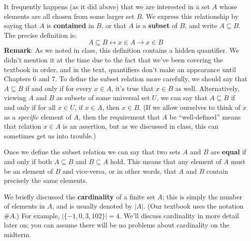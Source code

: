 \documentclass[letterpaper,12pt]{article}
\begin{document}
It frequently happens (as it did above) that we are interested in a set $A$ whose elements are all chosen from some larger set $B$. We express this relationship by saying that $A$ is {\bf contained} in $B$, or that $A$ is a {\bf subset} of $B$, and write $A\subseteq B$. The precise definition is:
\[
A\subseteq B \leftrightarrow x\in A \to x\in B
\]
{\bf Remark}: As we noted in class, this definition contains a hidden quantifier. We didn't mention it at the time due to the fact that we've been covering the textbook in order, and in the text, quantifiers don't make an appearance until Chapters 6 and 7. To define the subset relation more carefully, we should say that $A\subseteq B$ if and only if for every $x\in A$, it's true that $x\in B$ as well. Alternatively, viewing $A$ and $B$ as subsets of some universal set $U$, we can say that $A\subseteq B$ if and only if for all $x\in U$, if $x\in A$, then $x\in B$. (If we allow ourselves to think of $x$ as a {\em specific} element of $A$, then the requirement that $A$ be ``well-defined'' means that relation $x\in A$ is an assertion, but as we discussed in class, this can sometimes get us into trouble.)

Once we define the subset relation we can say that two sets $A$ and $B$ are {\bf equal} if and only if both $A\subseteq B$ and $B\subseteq A$ hold. This means that any element of $A$ must be an element of $B$ and vice-versa, or in other words, that $A$ and $B$ contain precisely the same elements.

We briefly discussed the {\bf cardinality} of a finite set $A$; this is simply the number of elements in $A$, and is usually denoted by $\lvert A\rvert$. (Our textbook uses the notation $\# A$.) For example, $\lvert\{-1,0,3,102\}\rvert = 4$. We'll discuss cardinality in more detail later on; you can assume there will be no problems about cardinality on the midterm.
\end{document}
